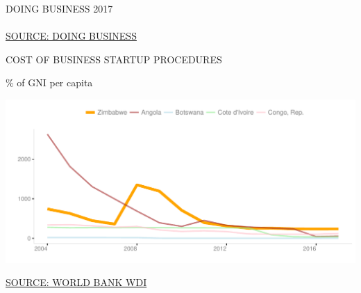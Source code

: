 \documentclass{article}\usepackage[]{graphicx}\usepackage[]{color}
\makeatletter
\def\maxwidth{ %
  \ifdim\Gin@nat@width>\linewidth
    \linewidth
  \else
    \Gin@nat@width
  \fi
}
\makeatother
\begin{document}
\begin{minipage}[b]{0.95\textwidth}
  \vspace{0.8cm}
  \hspace*{0.4cm} 
  \begin{minipage}[c]{0.50\textwidth} %
    \hspace{1ex}\small{\textcolor[HTML]{818181}{DOING BUSINESS 2017}}
   \\[4pt]
    \\[6pt]
     \hspace{1ex}\scriptsize{\href{http://www.doingbusiness.org}{\textcolor[HTML]{22A6F5}{SOURCE: DOING BUSINESS}}}
  \end{minipage}
    \begin{minipage}[c]{0.42\textwidth} 
    \hspace{4ex}\small{\textcolor[HTML]{818181}{COST OF BUSINESS STARTUP PROCEDURES}}
    
    \hspace{4ex}\footnotesize{\textcolor[HTML]{818181}{\% of GNI per capita}}


\hfill{}\includegraphics[width=\maxwidth]{figure/line_chart_Policy-1} 



    \hspace{4ex}\scriptsize{\href{http://data.worldbank.org}{\textcolor[HTML]{22A6F5}{SOURCE: WORLD BANK WDI}}} 
  \end{minipage}
\end{minipage}
\end{document}

